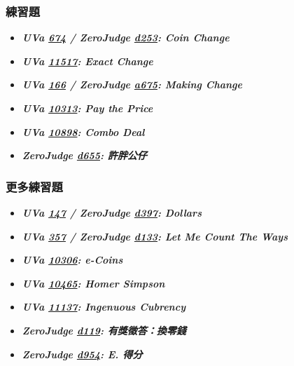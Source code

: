 \subsubsection*{練習題}
\begin{itemize}[label={\Checkmark}]
\item \textbf{\textit{UVa \href{http://uva.onlinejudge.org/external/6/674.html}{674} / ZeroJudge \href{http://zerojudge.tw/ShowProblem?problemid=d253}{d253}: Coin Change}}\\

\item \textbf{\textit{UVa \href{http://uva.onlinejudge.org/external/115/11517.html}{11517}: Exact Change}}\\

\item \textbf{\textit{UVa \href{http://uva.onlinejudge.org/external/1/166.html}{166} / ZeroJudge \href{http://zerojudge.tw/ShowProblem?problemid=a675}{a675}: Making Change}}\\

\item \textbf{\textit{UVa \href{http://uva.onlinejudge.org/external/103/10313.html}{10313}: Pay the Price}}\\

\item \textbf{\textit{UVa \href{http://uva.onlinejudge.org/external/108/10898.html}{10898}: Combo Deal}}\\

\item \textbf{\textit{ZeroJudge \href{http://zerojudge.tw/ShowProblem?problemid=d655}{d655}: 許胖公仔}}\\

\end{itemize}
\subsubsection*{更多練習題}
\begin{itemize}[label={\PencilLeftDown}]
\item \textbf{\textit{UVa \href{http://uva.onlinejudge.org/external/1/147.html}{147} / ZeroJudge \href{http://zerojudge.tw/ShowProblem?problemid=d397}{d397}: Dollars}}
\item \textbf{\textit{UVa \href{http://uva.onlinejudge.org/external/3/357.html}{357} / ZeroJudge \href{http://zerojudge.tw/ShowProblem?problemid=d133}{d133}: Let Me Count The Ways}}
\item \textbf{\textit{UVa \href{http://uva.onlinejudge.org/external/103/10306.html}{10306}: e-Coins}}
\item \textbf{\textit{UVa \href{http://uva.onlinejudge.org/external/104/10465.html}{10465}: Homer Simpson}}
\item \textbf{\textit{UVa \href{http://uva.onlinejudge.org/external/111/11137.html}{11137}: Ingenuous Cubrency}}
\item \textbf{\textit{ZeroJudge \href{http://zerojudge.tw/ShowProblem?problemid=d119}{d119}: 有獎徵答：換零錢}}
\item \textbf{\textit{ZeroJudge \href{http://zerojudge.tw/ShowProblem?problemid=d954}{d954}: E. 得分}}
\end{itemize}